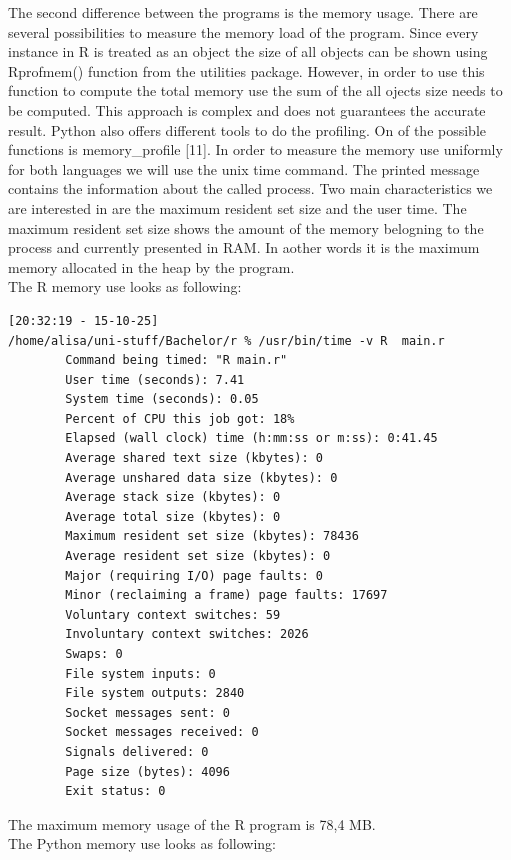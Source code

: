 \documentclass[
  twoside,
  12pt, a4paper,
  footinclude=true,
  headinclude=true,
  cleardoublepage=empty
]{article}
\begin{document}
The second difference between the programs is the memory usage. There are several possibilities to measure the memory load of the program. Since every instance in R is treated as an object the size of all objects can be shown using Rprofmem() function from the utilities package. However, in order to use this function to compute the total memory use the sum of the all ojects size needs to be computed. This approach is complex and does not guarantees the accurate result. Python also offers different tools to do the profiling. On of the possible functions is memory\_profile [11]. In order to measure the memory use uniformly for both languages we will use the unix time command. The printed message contains the information about the called process. Two main characteristics we are interested in are the maximum resident set size and the user time. The maximum resident set size shows the amount of the memory belogning to the process and currently presented in RAM. In aother words it is the maximum memory allocated in the heap by the program.\\ 
The R memory use looks as following:
\begin{verbatim}
[20:32:19 - 15-10-25] 
/home/alisa/uni-stuff/Bachelor/r % /usr/bin/time -v R  main.r
        Command being timed: "R main.r"
        User time (seconds): 7.41
        System time (seconds): 0.05
        Percent of CPU this job got: 18%
        Elapsed (wall clock) time (h:mm:ss or m:ss): 0:41.45
        Average shared text size (kbytes): 0
        Average unshared data size (kbytes): 0
        Average stack size (kbytes): 0
        Average total size (kbytes): 0
        Maximum resident set size (kbytes): 78436
        Average resident set size (kbytes): 0
        Major (requiring I/O) page faults: 0
        Minor (reclaiming a frame) page faults: 17697
        Voluntary context switches: 59
        Involuntary context switches: 2026
        Swaps: 0
        File system inputs: 0
        File system outputs: 2840
        Socket messages sent: 0
        Socket messages received: 0
        Signals delivered: 0
        Page size (bytes): 4096
        Exit status: 0
\end{verbatim}
The maximum memory usage of the R program is 78,4 MB.\\
The Python memory use looks as following:
\end{document}
